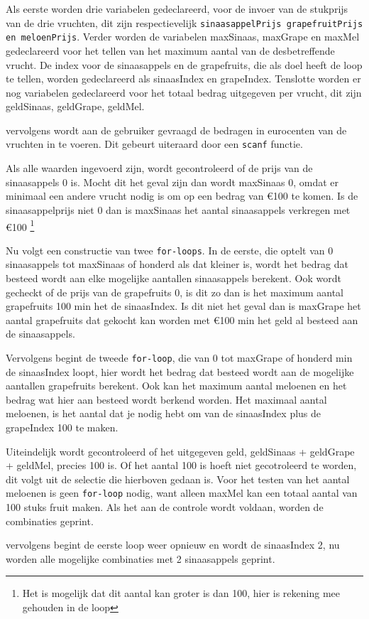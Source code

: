 Als eerste worden drie variabelen gedeclareerd, voor de invoer van de stukprijs van de drie vruchten, dit zijn respectievelijk {\tt sinaasappelPrijs grapefruitPrijs en meloenPrijs}.
Verder worden de variabelen maxSinaas, maxGrape en maxMel gedeclareerd voor het tellen van het maximum aantal van de desbetreffende vrucht.
De index voor de sinaasappels en de grapefruits, die als doel heeft de loop te tellen, worden gedeclareerd als sinaasIndex en grapeIndex.
Tenslotte worden er nog variabelen gedeclareerd voor het totaal bedrag uitgegeven per vrucht, dit zijn geldSinaas, geldGrape, geldMel.

vervolgens wordt aan de gebruiker gevraagd de bedragen in eurocenten van de vruchten  in te voeren.
Dit gebeurt uiteraard door een {\tt scanf} functie.

Als alle waarden ingevoerd zijn, wordt gecontroleerd of de prijs van de sinaasappels 0 is.
Mocht dit het geval zijn dan wordt maxSinaas 0, omdat er minimaal een andere vrucht nodig is om op een bedrag van \euro100 te komen.
Is de sinaasappelprijs niet 0 dan is maxSinaas het aantal sinaasappels verkregen met \euro100 \footnote{Het is mogelijk dat dit aantal kan groter is dan 100, hier is rekening mee gehouden in de loop}

Nu volgt een constructie van twee {\tt for-loops}.
In de eerste, die optelt van 0 sinaasappels tot maxSinaas of honderd als dat kleiner is, wordt het bedrag dat besteed wordt aan elke mogelijke aantallen sinaasappels berekent.
Ook wordt gecheckt of de prijs van de grapefruits 0, is dit zo dan is het maximum aantal grapefruits 100 min het de sinaasIndex.
Is dit niet het geval dan is maxGrape het aantal grapefruits dat gekocht kan worden met \euro100 min het geld al besteed aan de sinaasappels.

Vervolgens begint de tweede {\tt for-loop}, die van 0 tot maxGrape of honderd min de sinaasIndex loopt, hier wordt het bedrag dat besteed wordt aan de mogelijke aantallen grapefruits berekent.
Ook kan het maximum aantal meloenen en het bedrag wat hier aan besteed wordt berkend worden.
Het maximaal aantal meloenen, is het aantal dat je nodig hebt om van de sinaasIndex plus de grapeIndex 100 te maken.

Uiteindelijk wordt gecontroleerd of het uitgegeven geld, geldSinaas + geldGrape + geldMel, precies 100 is.
Of het aantal 100 is hoeft niet gecotroleerd te worden, dit volgt uit de selectie die hierboven gedaan is.
Voor het testen van het aantal meloenen is geen {\tt for-loop} nodig, want alleen maxMel kan een totaal aantal van 100 stuks fruit maken.
Als het aan de controle wordt voldaan, worden de combinaties geprint.

vervolgens begint de eerste loop weer opnieuw en wordt de sinaasIndex 2, nu worden alle mogelijke combinaties met 2 sinaasappels geprint.

